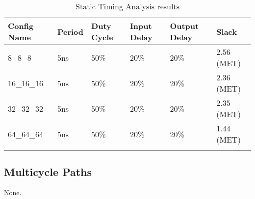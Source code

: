 \renewcommand*{\arraystretch}{1.4}
\begin{longtable}[H]{
    | p{}
    | p{}
    | p{}
    | p{}
    | p{}
    | p{} |
  }
  \hline
  \textbf{Config Name}   &
  \textbf{Period}        &
  \textbf{Duty Cycle}    &
  \textbf{Input Delay}   &
  \textbf{Output Delay}  &
  \textbf{Slack}           \\ \hline \hline

  8\_8\_8 &
  5ns &
  50\% &
  20\% &
  20\% &
  2.56 (MET) \\ \hline

  16\_16\_16 &
  5ns &
  50\% &
  20\% &
  20\% &
  2.36 (MET) \\ \hline

  32\_32\_32 &
  5ns &
  50\% &
  20\% &
  20\% &
  2.35 (MET) \\ \hline

  64\_64\_64 &
  5ns &
  50\% &
  20\% &
  20\% &
  1.44 (MET) \\ \hline

  \caption{Static Timing Analysis results}\label{table:timing}
\end{longtable}

\subsection{Multicycle Paths}
None.
